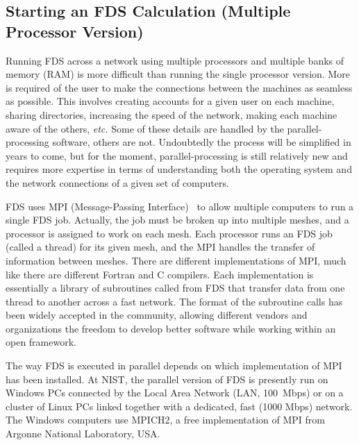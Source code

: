\documentclass[11pt]{book}
\begin{document}
\subsection{Starting an FDS Calculation (Multiple Processor Version)}
\label{info:parallelprocessing}
Running FDS across a network using multiple processors and multiple
banks of memory (RAM) is more difficult than running the single
processor version.  More is required of the user to make the
connections between the machines as seamless as possible. This
involves creating accounts for a given user on each machine, sharing
directories, increasing the speed of the network, making each machine
aware of the others, {\em etc.}  Some of these details are handled by
the parallel-processing software, others are not. Undoubtedly the
process will be simplified in years to come, but for the moment,
parallel-processing is still relatively new and requires more
expertise in terms of understanding both the operating system and the
network connections of a given set of computers.

FDS uses MPI (Message-Passing Interface)~\cite{Gropp:1} to allow
multiple computers to run a single FDS job. Actually, the job must be
broken up into multiple meshes, and a processor is assigned to work on
each mesh. Each processor runs an FDS job (called a thread) for its
given mesh, and the MPI handles the transfer of information between
meshes.  There are different implementations of MPI, much like there
are different Fortran and C compilers. Each implementation is
essentially a library of subroutines called from FDS that transfer
data from one thread to another across a fast network. The format of
the subroutine calls has been widely accepted in the community,
allowing different vendors and organizations the freedom to develop
better software while working within an open framework.

The way FDS is executed in parallel depends on which implementation of
MPI has been installed.  At NIST, the parallel version of FDS is
presently run on Windows PCs connected by the Local Area Network (LAN,
100~Mbps) or on a cluster of Linux PCs linked together with a
dedicated, fast (1000 Mbps) network.  The Windows computers use
MPICH2, a free implementation of MPI from Argonne National Laboratory,
USA.
\end{document}

